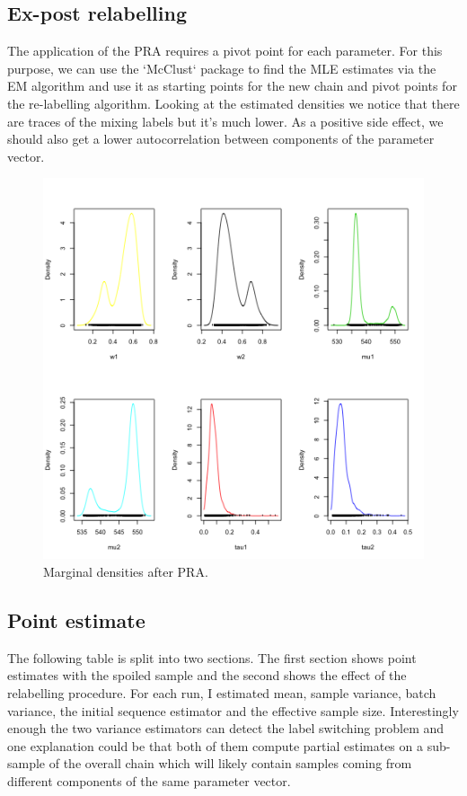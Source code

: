 \documentclass{article}
\begin{document}
\subsection{Ex-post relabelling}
The application of the PRA requires a pivot point for each parameter. For this purpose, we can use the `McClust` package to find the MLE estimates via the EM algorithm and use it as starting points for the new chain and pivot points for the re-labelling algorithm. Looking at the estimated densities we notice that there are traces of the mixing labels but it's much lower. As a positive side effect, we should also get a lower autocorrelation between components of the parameter vector.

\begin{figure}[h!]
    \centering
    \includegraphics[width=.7\textwidth]{plot_7.png}
    \caption{Marginal densities after PRA.}
    \label{Monkey measurement}
\end{figure}

\subsection{Point estimate}
The following table is split into two sections. The first section shows point estimates with the spoiled sample and the second shows the effect of the relabelling procedure.
For each run, I estimated mean, sample variance, batch variance, the initial sequence estimator and the effective sample size. Interestingly enough the two variance estimators can detect the label switching problem and one explanation could be that both of them compute partial estimates on a sub-sample of the overall chain which will likely contain samples coming from different components of the same parameter vector.
\end{document}
